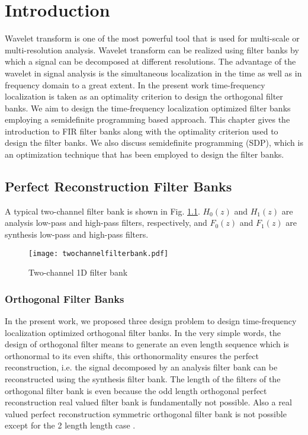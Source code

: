 \chapter{\label{Intro}Introduction}
Wavelet transform is one of the most powerful tool that is used for multi-scale or multi-resolution analysis. Wavelet transform can be realized using filter banks by which a signal can be decomposed at different resolutions. The advantage of the wavelet in signal analysis is the simultaneous localization in the time as well as in frequency domain to a great extent. In the present work time-frequency localization is taken as an optimality criterion to design the orthogonal filter banks. We aim to design the time-frequency localization optimized filter banks employing a semidefinite programming based approach. This chapter gives the introduction to FIR filter banks along with the optimality criterion used to design the filter banks. We also discuss semidefinite programming (SDP), which is an optimization technique that has been employed to design the filter banks. 

\section{\label{sub:Perfect-Reconstruction-Filter-1}Perfect Reconstruction Filter Banks}
A typical two-channel filter bank is shown in Fig. \ref{fig:two-channel-1D-filter-1-1}. $H_{0}(z)$ and $H_{1}(z)$ are analysis low-pass and high-pass filters, respectively, and $F_{0}(z)$ and $F_{1}(z)$ are synthesis low-pass and high-pass filters\cite{saketmanish}. 

\begin{figure}[tbh]
\centering{}\texttt{[image: twochannelfilterbank.pdf]}
\caption{\label{fig:two-channel-1D-filter-1-1}Two-channel 1D filter bank}
\end{figure}

\subsection{Orthogonal Filter Banks}
In the present work, we proposed three design problem to design time-frequency localization optimized orthogonal filter banks. In the very simple words, the design of orthogonal filter means to generate an even length sequence which is orthonormal to its even shifts, this orthonormality ensures the perfect reconstruction, i.e. the signal decomposed by an analysis filter bank can be reconstructed using the synthesis filter bank. The length of the filters of the orthogonal filter bank is even because the odd length orthogonal perfect reconstruction real valued filter bank is fundamentally not possible. Also a real valued perfect reconstruction symmetric orthogonal filter bank is not possible except for the 2 length length case \cite{strang}. 

